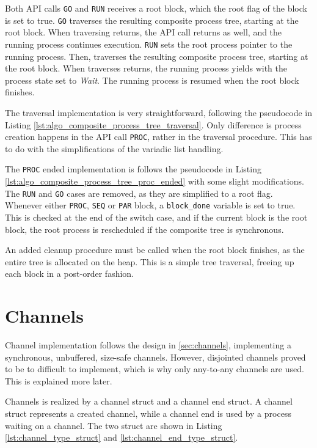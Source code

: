 Both API calls \texttt{GO} and \texttt{RUN} receives a root block, which the root flag of the block is set to true. \texttt{GO} traverses the resulting composite process tree, starting at the root block. When traversing returns, the API call returns as well, and the running process continues execution. \texttt{RUN} sets the root process pointer to the running process. Then, traverses the resulting composite process tree, starting at the root block. When traverses returns, the running process yields with the process state set to \textit{Wait}. The running process is resumed when the root block finishes.

The traversal implementation is very straightforward, following the pseudocode in Listing \ref{lst:algo_composite_process_tree_traversal}. Only difference is process creation happens in the API call \texttt{PROC}, rather in the traversal procedure. This has to do with the simplifications of the variadic list handling. 

The \texttt{PROC} ended implementation is follows the pseudocode in Listing \ref{lst:algo_composite_process_tree_proc_ended} with some slight modifications. The \texttt{RUN} and \texttt{GO} cases are removed, as they are simplified to a root flag. Whenever either \texttt{PROC}, \texttt{SEQ} or \texttt{PAR} block, a \texttt{block\_done} variable is set to true. This is checked at the end of the switch case, and if the current block is the root block, the root process is rescheduled if the composite tree is synchronous. 

An added cleanup procedure must be called when the root block finishes, as the entire tree is allocated on the heap. This is a simple tree traversal, freeing up each block in a post\hyp{}order fashion. 

\section{Channels}

Channel implementation follows the design in \ref{sec:channels}, implementing a synchronous, unbuffered, size\hyp{}safe channels. However, disjointed channels proved to be to difficult to implement, which is why only any\hyp{}to\hyp{}any channels are used. This is explained more later. 

Channels is realized by a channel struct and a channel end struct. A channel struct represents a created channel, while a channel end is used by a process waiting on a channel. The two struct are shown in Listing \ref{lst:channel_type_struct} and \ref{lst:channel_end_type_struct}.

